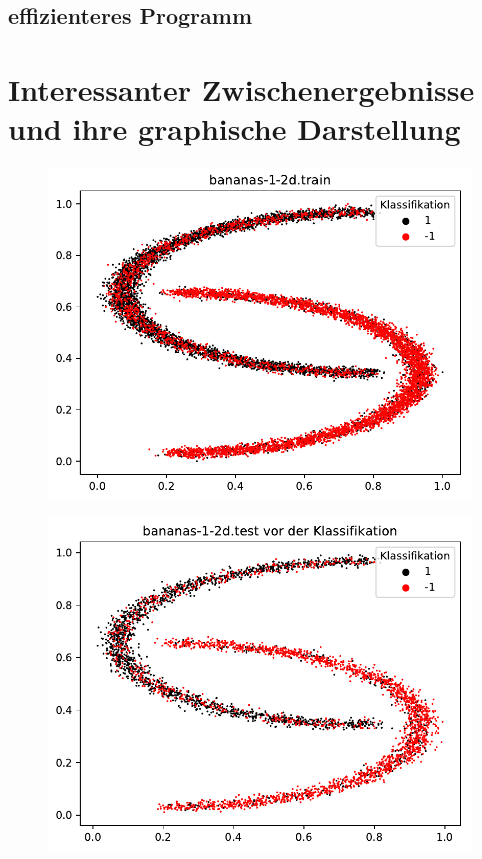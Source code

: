 \documentclass{beamer}
\begin{document}
\subsection{effizienteres Programm}



\section{Interessanter Zwischenergebnisse und ihre graphische Darstellung}
\begin{figure}[h]
\centering
\includegraphics[scale=0.7]{bananas-1-2d-train.pdf}
\label{bananas}
\end{figure}

\begin{figure}[h]
\centering
\includegraphics[scale=0.7]{bananas-1-2d-test-vorher.pdf}
\label{bananas}
\end{figure}
\end{document}
